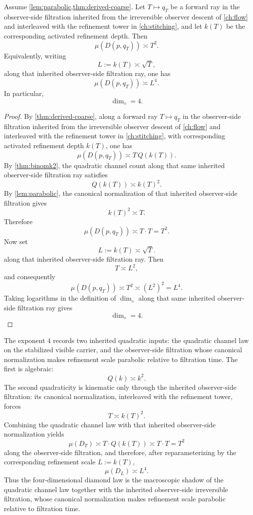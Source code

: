 \begin{theorem}
	\label{thm:4D}
	Assume \cref{lem:parabolic,thm:derived-coarse}.  Let \(T\mapsto q_T\) be
	a forward ray in the observer-side filtration inherited from the
	irreversible observer descent of \cref{ch:flow} and interleaved with
	the refinement tower in \cref{ch:stitching}, and let \(k(T)\) be the
	corresponding activated refinement depth.  Then
	\[
		\mu(D(p,q_T))\asymp T^2.
	\]
	Equivalently, writing
	\[
		L:=k(T)\asymp \sqrt T,
	\]
	along that inherited observer-side filtration ray, one has
	\[
		\mu(D(p,q_T))\asymp L^4.
	\]
	In particular,
	\[
		\dim_\diamond=4.
	\]
\end{theorem}
\begin{proof}
	By \cref{thm:derived-coarse}, along a forward ray
	\(T\mapsto q_T\) in the observer-side filtration inherited from the
	irreversible observer descent of \cref{ch:flow} and interleaved with
	the refinement tower in \cref{ch:stitching}, with corresponding
	activated refinement depth \(k(T)\), one has
	\[
		\mu(D(p,q_T))\asymp T\,Q(k(T)).
	\]
	By \cref{thm:binomk2}, the quadratic channel count along that same
	inherited observer-side filtration ray satisfies
	\[
		Q(k(T))\asymp k(T)^2.
	\]
	By \cref{lem:parabolic}, the canonical normalization of that
	inherited observer-side filtration gives
	\[
		k(T)^2\asymp T.
	\]
	Therefore
	\[
		\mu(D(p,q_T))\asymp T\cdot T=T^2.
	\]
	Now set
	\[
		L:=k(T)\asymp \sqrt T.
	\]
	along that inherited observer-side filtration ray.
	Then
	\[
		T\asymp L^2,
	\]
	and consequently
	\[
		\mu(D(p,q_T))\asymp T^2\asymp (L^2)^2=L^4.
	\]
	Taking logarithms in the definition of \(\dim_\diamond\) along that
	same inherited observer-side filtration ray gives
	\[
		\dim_\diamond=4.
	\]
\end{proof}
\begin{remark}
	The exponent \(4\) records two inherited quadratic inputs: the
	quadratic channel law on the stabilized visible carrier, and the
	observer-side filtration whose canonical normalization makes
	refinement scale parabolic relative to filtration time.
	The first is algebraic:
	\[
		Q(k)\asymp k^2.
	\]
	The second quadraticity is kinematic only through the inherited
	observer-side filtration: its canonical normalization, interleaved
	with the refinement tower, forces
	\[
		T\asymp k(T)^2.
	\]
	Combining the quadratic channel law with that inherited
	observer-side normalization yields
	\[
		\mu(D_T)\asymp T\cdot Q(k(T))\asymp T\cdot T=T^2
	\]
	along the observer-side filtration, and therefore, after
	reparameterizing by the corresponding refinement scale \(L:=k(T)\),
	\[
		\mu(D_L)\asymp L^4.
	\]
	Thus the four-dimensional diamond law is the macroscopic shadow of the
	quadratic channel law together with the inherited observer-side
	irreversible filtration, whose canonical normalization makes
	refinement scale parabolic relative to filtration time.
\end{remark}
